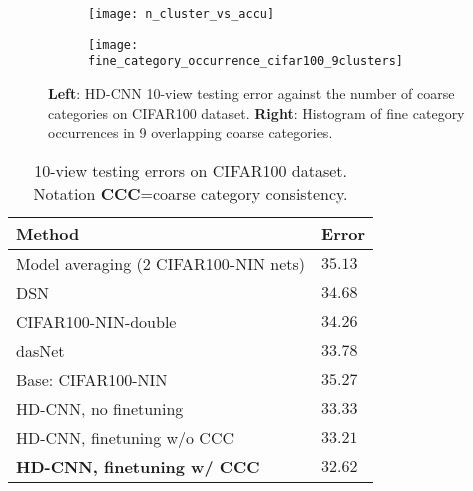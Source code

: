 \documentclass[10pt,twocolumn,letterpaper]{article}
\begin{document}
\begin{figure}[h]
\vspace{-1em}
\centering
\begin{subfigure}{.30\textwidth}
  \centering
  \texttt{[image: n\_cluster\_vs\_accu]}
\end{subfigure}\begin{subfigure}{.18\textwidth}
  \centering
  \texttt{[image: fine\_category\_occurrence\_cifar100\_9clusters]}
\end{subfigure}
\caption{\textbf{Left}: HD-CNN 10-view testing error against the number of coarse categories on CIFAR100 dataset. \textbf{Right}: Histogram of fine category occurrences in 9 overlapping coarse categories.}
\vspace{-1em}
\label{fig:cifar100_internal_comp}
\end{figure}





{\renewcommand{\arraystretch}{1.2}\begin{table}[t]
\caption{10-view testing errors on CIFAR100 dataset. Notation \textbf{CCC}=coarse category consistency. }
\label{tab: cifar_results} 
\vspace{-2em}
\begin{center}
    \begin{tabular}{ p{6.4cm} | p{1.1cm}}
    Method & Error \\ 
    \hline \hline
Model averaging ($2$ CIFAR100-NIN nets) &  $35.13$ \\ \hline    
    DSN ~\cite{lee2014deeply}  & $34.68$  \\ \hline
    CIFAR100-NIN-double & $34.26$ \\ \hline    
    dasNet~\cite{stollenga2014deep} &  $33.78$  \\ \hline
    \hline
    Base: CIFAR100-NIN & $35.27$ \\ \hline
    HD-CNN, no finetuning &  $33.33$ \\ \hline
    HD-CNN, finetuning w/o CCC &  $33.21$ \\ \hline
    \textbf{HD-CNN, finetuning w/ CCC} &  $\mathbf{32.62}$ \\ \hline
    \end{tabular}   
\end{center}
\vspace{-1em}
\end{table}
}
\end{document}

